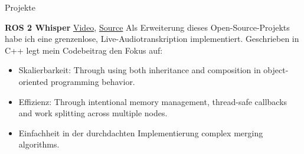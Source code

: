 \begin{rubric}{Projekte}

\entry*[2024] \textbf{ROS 2 Whisper} \hfill \href{https://github.com/NathanCorral/ros2_whisper/blob/dev-code-cleanup/doc/harry_potter_sample.gif}{Video}, \href{https://github.com/NathanCorral/ros2_whisper/tree/dev-code-cleanup}{\faGithub Source} \newline  
Als Erweiterung dieses Open-Source-Projekts habe ich eine grenzenlose, Live-Audiotranskription implementiert. Geschrieben in C++ legt mein Codebeitrag den Fokus auf: \newline  
\vspace{\CVItemizeHeaderSpacing} \begin{itemize}  
	\setlength{\itemsep}{\CVItemizeSpacing}  
	\item Skalierbarkeit:  Through using both inheritance and composition in object-oriented programming behavior.
	\item Effizienz:  Through intentional memory management, thread-safe callbacks and work splitting across multiple nodes.
	\item Einfachheit in der durchdachten Implementierung complex merging algorithms.
\end{itemize}  

\begin{comment}
\entry*[2024] \textbf{ROS 2 Computer Vision} \hfill \href{https://github.com/NathanCorral/ROS-HF-Vision/blob/main/doc/gifs/ex_german_roads.gif}{Video}, \href{https://github.com/NathanCorral/ROS-HF-Vision/tree/main}{\faGithub Source} \newline  
Das Ausführen mehrerer Computer-Vision-Modelle (DETR, Maskformer), die für verschiedene Datensätze/Aufgaben trainiert wurden, auf einem Live-Kamerastream stellt mehrere Implementierungsherausforderungen dar. Dieses Python-Repository bietet eine Lösung für: \newline  
\vspace{\CVItemizeHeaderSpacing} \begin{itemize}  
	\setlength{\itemsep}{\CVItemizeSpacing}  
	\item Das Herunterladen und Ausführen von State-of-the-Art-Modellen aus Hugging Face als asynchrone ROS 2 Nodes.  
	\item Das Hosten eines Label Server, um Modell-Ausgaben in einer globalen Datenbank neu zu adressieren.  
	\item Die Anzeige von Segmentation Masks und Bounding Boxes als Matplotlib Animations.  
	\item Das Veröffentlichen von Datensatzbildern zur wiederholbaren Evaluierung von CV-Modellen.  
\end{itemize}  


\end{comment}
\end{rubric}
